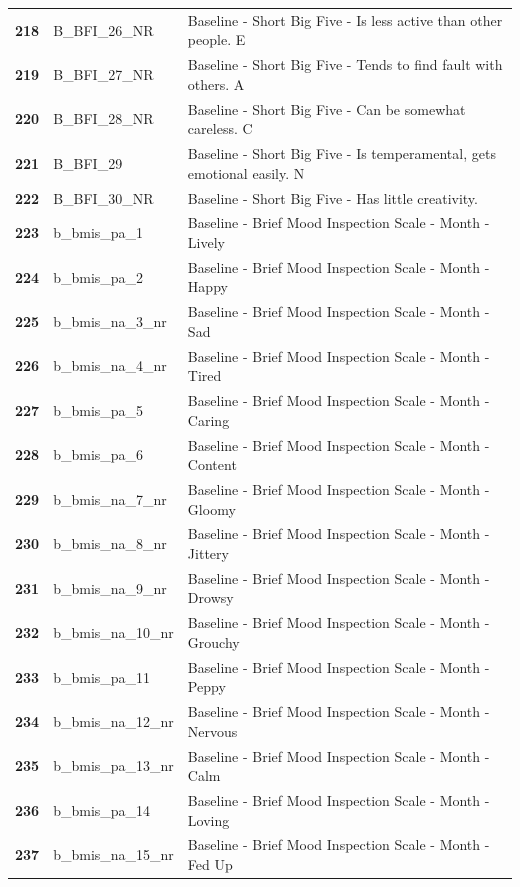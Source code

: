 \documentclass[
  letterpaper,
  DIV=11,
  numbers=noendperiod]{scrartcl}
\begin{document}
\begin{longtable}[t]{>{}cll}
\textbf{218} & B\_BFI\_26\_NR & Baseline - Short Big Five - Is less active than other people. E\\
\textbf{219} & B\_BFI\_27\_NR & Baseline - Short Big Five - Tends to find fault with others. A\\
\textbf{220} & B\_BFI\_28\_NR & Baseline - Short Big Five - Can be somewhat careless. C\\
\addlinespace
\textbf{221} & B\_BFI\_29 & Baseline - Short Big Five - Is temperamental, gets emotional easily. N\\
\textbf{222} & B\_BFI\_30\_NR & Baseline - Short Big Five - Has little creativity.\\
\textbf{223} & b\_bmis\_pa\_1 & Baseline - Brief Mood Inspection Scale - Month - Lively\\
\textbf{224} & b\_bmis\_pa\_2 & Baseline - Brief Mood Inspection Scale - Month - Happy\\
\textbf{225} & b\_bmis\_na\_3\_nr & Baseline - Brief Mood Inspection Scale - Month - Sad\\
\addlinespace
\textbf{226} & b\_bmis\_na\_4\_nr & Baseline - Brief Mood Inspection Scale - Month - Tired\\
\textbf{227} & b\_bmis\_pa\_5 & Baseline - Brief Mood Inspection Scale - Month - Caring\\
\textbf{228} & b\_bmis\_pa\_6 & Baseline - Brief Mood Inspection Scale - Month - Content\\
\textbf{229} & b\_bmis\_na\_7\_nr & Baseline - Brief Mood Inspection Scale - Month - Gloomy\\
\textbf{230} & b\_bmis\_na\_8\_nr & Baseline - Brief Mood Inspection Scale - Month - Jittery\\
\addlinespace
\textbf{231} & b\_bmis\_na\_9\_nr & Baseline - Brief Mood Inspection Scale - Month - Drowsy\\
\textbf{232} & b\_bmis\_na\_10\_nr & Baseline - Brief Mood Inspection Scale - Month - Grouchy\\
\textbf{233} & b\_bmis\_pa\_11 & Baseline - Brief Mood Inspection Scale - Month - Peppy\\
\textbf{234} & b\_bmis\_na\_12\_nr & Baseline - Brief Mood Inspection Scale - Month - Nervous\\
\textbf{235} & b\_bmis\_pa\_13\_nr & Baseline - Brief Mood Inspection Scale - Month - Calm\\
\addlinespace
\textbf{236} & b\_bmis\_pa\_14 & Baseline - Brief Mood Inspection Scale - Month - Loving\\
\textbf{237} & b\_bmis\_na\_15\_nr & Baseline - Brief Mood Inspection Scale - Month - Fed Up\\

\end{longtable}
\end{document}
